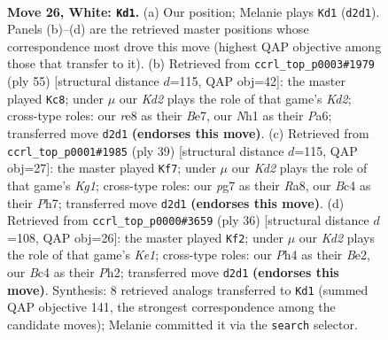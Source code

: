 \documentclass[11pt]{article}
\begin{document}
\clearpage

\begin{figure}[p]\centering
\begin{subfigure}{0.46\textwidth}\centering
\resizebox{\linewidth}{!}{%
\newchessgame
\chessboard[
  setfen={4rb2/2nkn1pr/6b1/7p/p1B1pP1P/P3R3/1P1K2P1/R5NN w - - 12 26},
  showmover=false,
  pgfstyle=straightmove, color=movearrow, markmove={d2-d1}
]}
\caption{}
\end{subfigure}\hfill
\begin{subfigure}{0.46\textwidth}\centering
\resizebox{\linewidth}{!}{%
\newchessgame
\chessboard[
  setfen={5r2/3kb3/ppn1p3/2pr4/P5p1/1P2P3/3NKPP1/1R1RB3 b - - 2 28},
  showmover=false,
  pgfstyle=straightmove, color=movearrow, markmove={d7-c8}
]}
\caption{}
\end{subfigure}
\\[4pt]
\begin{subfigure}{0.46\textwidth}\centering
\resizebox{\linewidth}{!}{%
\newchessgame
\chessboard[
  setfen={r3r1k1/1p5p/p2b1pp1/3p3n/3N4/3PB2P/PP3PP1/R3RK2 b - - 1 20},
  showmover=false,
  pgfstyle=straightmove, color=movearrow, markmove={g8-f7}
]}
\caption{}
\end{subfigure}\hfill
\begin{subfigure}{0.46\textwidth}\centering
\resizebox{\linewidth}{!}{%
\newchessgame
\chessboard[
  setfen={2r4r/pp1bkpp1/2n1p1p1/8/1P3P2/P3P3/3NB1PP/2R1K2R w K - 1 19},
  showmover=false,
  pgfstyle=straightmove, color=movearrow, markmove={e1-f2}
]}
\caption{}
\end{subfigure}
\caption{\textbf{Move 26, White: \texttt{Kd1}.} (a) Our position; Melanie plays \texttt{Kd1} (\texttt{d2d1}). Panels (b)--(d) are the retrieved master positions whose correspondence most drove this move (highest QAP objective among those that transfer to it). (b) Retrieved from \texttt{ccrl\_top\_p0003\#1979} (ply 55) [structural distance $d$=115, QAP obj=42]: the master played \texttt{Kc8}; under $\mu$ our \emph{Kd2} plays the role of that game's \emph{Kd2}; cross-type roles: our \emph{r}e8 as their \emph{B}e7, our \emph{N}h1 as their \emph{P}a6; transferred move \texttt{d2d1} \textbf{(endorses this move)}. (c) Retrieved from \texttt{ccrl\_top\_p0001\#1985} (ply 39) [structural distance $d$=115, QAP obj=27]: the master played \texttt{Kf7}; under $\mu$ our \emph{Kd2} plays the role of that game's \emph{Kg1}; cross-type roles: our \emph{p}g7 as their \emph{R}a8, our \emph{B}c4 as their \emph{P}h7; transferred move \texttt{d2d1} \textbf{(endorses this move)}. (d) Retrieved from \texttt{ccrl\_top\_p0000\#3659} (ply 36) [structural distance $d$=108, QAP obj=26]: the master played \texttt{Kf2}; under $\mu$ our \emph{Kd2} plays the role of that game's \emph{Ke1}; cross-type roles: our \emph{P}h4 as their \emph{B}e2, our \emph{B}c4 as their \emph{P}h2; transferred move \texttt{d2d1} \textbf{(endorses this move)}. Synthesis: 8 retrieved analogs transferred to \texttt{Kd1} (summed QAP objective 141, the strongest correspondence among the candidate moves); Melanie committed it via the \texttt{search} selector.}
\label{fig:thought-m50}
\end{figure}
\end{document}
